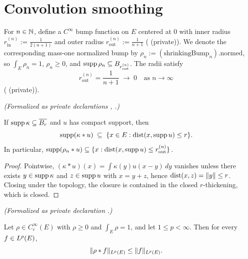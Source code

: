 \section{Convolution smoothing}

For $n \in \mathbb{N}$, define a $C^\infty$ bump function on $E$ centered at $0$ with
inner radius $r_{\text{in}}^{(n)} := \frac{1}{2(n+1)}$ and outer radius
$r_{\text{out}}^{(n)} := \frac{1}{n+1}$ ( (private)).
We denote the corresponding mass-one normalized bump by $\rho_n :=
(\text{shrinkingBump}_n).\text{normed}$, so $\int_E \rho_n = 1$, $\rho_n \ge 0$,
and $\operatorname{supp} \rho_n \subseteq B_{r_{\text{out}}^{(n)}}$. The radii satisfy
\begin{equation*}
  r_{\text{out}}^{(n)} = \frac{1}{n+1} \;\to\; 0
  \quad\text{as } n \to \infty
\end{equation*}
( (private)).

\begin{lemma}
\label{lem:tsupport_conv}
\leanok
\noindent\textit{(Formalized as private declarations , .)}\par
If $\operatorname{supp} \kappa \subseteq \overline{B_{r}}$ and $u$ has compact support, then
\begin{equation*}
  \operatorname{supp}(\kappa * u) \;\subseteq\; \{x \in E : \operatorname{dist}(x, \operatorname{supp} u) \le r\}.
\end{equation*}
In particular, $\operatorname{supp}(\rho_n * u) \subseteq \{x : \operatorname{dist}(x,\operatorname{supp} u) \le
r_{\text{out}}^{(n)}\}$.
\end{lemma}

\begin{proof}
\leanok

Pointwise, $(\kappa * u)(x) = \int \kappa(y) u(x - y)\,dy$ vanishes unless
there exists $y \in \operatorname{supp}\kappa$ and $z \in \operatorname{supp} u$ with $x = y + z$, hence
$\operatorname{dist}(x, z) = \|y\| \le r$. Closing under the topology, the closure is
contained in the closed $r$-thickening, which is closed.
\end{proof}

\begin{proposition}
\label{prop:Lp_contraction_conv}
\leanok
\noindent\textit{(Formalized as private declaration .)}\par
Let $\rho \in C_c^\infty(E)$ with $\rho \ge 0$ and $\int_E \rho = 1$, and let
$1 \le p < \infty$. Then for every $f \in L^{p}(E)$,
\begin{equation*}
  \|\rho * f\|_{L^{p}(E)} \le \|f\|_{L^{p}(E)}.
\end{equation*}
\end{proposition}


